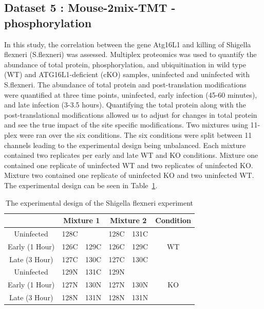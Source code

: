 \documentclass{mcp}
\begin{document}
\clearpage
\subsection{Dataset 5 : Mouse-2mix-TMT - phosphorylation}
\label{sec:shigella}

In this study, the correlation between the gene Atg16L1 and killing of Shigella flexneri (S.flexneri) was assessed. \cite{Maculins} Multiplex proteomics was used to quantify the abundance of total protein, phosphorylation, and ubiquitination in wild type (WT) and ATG16L1-deficient (cKO) samples, uninfected and uninfected with S.flexneri. The abundance of total protein and post-translation modifications were quantified at three time points, uninfected, early infection (45-60 minutes), and late infection (3-3.5 hours). Quantifying the total protein along with the post-translational modifications allowed us to adjust for changes in total protein and see the true impact of the site specific modifications. Two mixtures using 11-plex were ran over the six conditions. The six conditions were split between 11 channels leading to the experimental design being unbalanced. Each mixture contained two replicates per early and late WT and KO conditions. Mixture one contained one replicate of uninfected WT and two replicates of uninfected KO. Mixture two contained one replicate of uninfected KO and two uninfected WT. The experimental design can be seen in Table~\ref{table:shigella_design}.

\begin{table}[h!]
\centering
\begin{tabular}{|c | c c | c c | c|}
\hline
 & \multicolumn{2}{c}{Mixture 1} & \multicolumn{2}{c}{Mixture 2} & Condition \\ [0.5ex]
 \hline\hline
 Uninfected & 128C & & 128C & 131C & \\
 \hline
Early (1 Hour) & 126C & 129C & 126C & 129C & WT \\
\hline
Late (3 Hour) & 127C & 130C & 127C & 130C & \\
\hline
Uninfected & 129N & 131C & 129N & & \\
\hline
Early (1 Hour) & 127N & 130N & 127N & 130N & KO \\
\hline
Late (3 Hour) & 128N & 131N & 128N & 131N & \\
\hline

\end{tabular}
\caption{The experimental design of the Shigella flexneri experiment}
\label{table:shigella_design}
\end{table}
\end{document}
